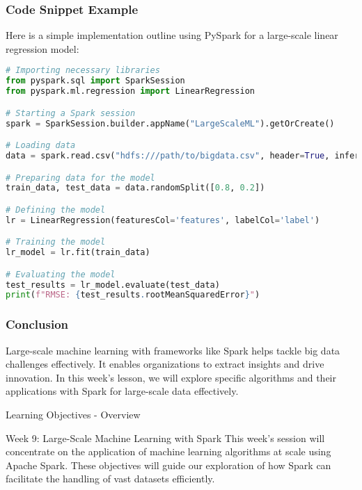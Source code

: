 \documentclass[aspectratio=169]{beamer}
\begin{document}
\begin{frame}[fragile]
    \frametitle{Code Snippet Example}
    Here is a simple implementation outline using PySpark for a large-scale linear regression model:
    \begin{lstlisting}[language=Python]
# Importing necessary libraries
from pyspark.sql import SparkSession
from pyspark.ml.regression import LinearRegression

# Starting a Spark session
spark = SparkSession.builder.appName("LargeScaleML").getOrCreate()

# Loading data
data = spark.read.csv("hdfs:///path/to/bigdata.csv", header=True, inferSchema=True)

# Preparing data for the model
train_data, test_data = data.randomSplit([0.8, 0.2]) 

# Defining the model
lr = LinearRegression(featuresCol='features', labelCol='label')

# Training the model
lr_model = lr.fit(train_data)

# Evaluating the model
test_results = lr_model.evaluate(test_data)
print(f"RMSE: {test_results.rootMeanSquaredError}")
    \end{lstlisting}
\end{frame}

\begin{frame}[fragile]
    \frametitle{Conclusion}
    Large-scale machine learning with frameworks like Spark helps tackle big data challenges effectively. It enables organizations to extract insights and drive innovation. 
    In this week’s lesson, we will explore specific algorithms and their applications with Spark for large-scale data effectively.
\end{frame}

\begin{frame}[fragile]{Learning Objectives - Overview}
  \begin{block}{Week 9: Large-Scale Machine Learning with Spark}
    This week's session will concentrate on the application of machine learning algorithms at scale using Apache Spark. These objectives will guide our exploration of how Spark can facilitate the handling of vast datasets efficiently.
  \end{block}
\end{frame}
\end{document}
